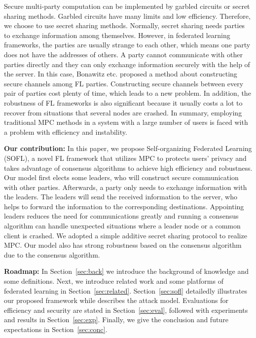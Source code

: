 Secure multi-party computation can be implemented by garbled circuits or secret sharing methods\cite{Shamir}. Garbled circuits have many limits and low efficiency. Therefore, we choose to use secret sharing methods. Normally, secret sharing needs parties to exchange information among themselves. However, in federated learning frameworks, the parties are usually strange to each other, which means one party does not have the addresses of others. A party cannot communicate with other parties directly and they can only exchange information securely with the help of the server. In this case, Bonawitz etc.\cite{Practical} proposed a method about constructing secure channels among FL parties. Constructing secure channels between every pair of parties cost plenty of time, which leads to a new problem. In addition, the robustness of FL frameworks is also significant because it usually costs a lot to recover from situations that several nodes are crashed. In summary, employing traditional MPC methods in a system with a large number of users is faced with a problem with efficiency and instability.

\textbf{Our contribution: }In this paper, we propose Self-organizing Federated Learning (SOFL), a novel FL framework that utilizes MPC to protects users' privacy and takes advantage of consensus algorithms to achieve high efficiency and robustness. Our model first elects some leaders, who will construct secure communication with other parties. Afterwards, a party only needs to exchange information with the leaders. The leaders will send the received information to the server, who helps to forward the information to the corresponding destinations. Appointing leaders reduces the need for communications greatly and running a consensus algorithm can handle unexpected situations where a leader node or a common client is crashed. We adopted a simple additive secret sharing protocol to realize MPC. Our model also has strong robustness based on the consensus algorithm due to the consensus algorithm. 

\textbf{Roadmap:} In Section~\ref{sec:back} we introduce the background of knowledge and some definitions. Next, we introduce related work and some platforms of federated learning in Section~\ref{sec:related}. Section~\ref{sec:sofl} detailedly illustrates our proposed framework while describes the attack model. Evaluations for efficiency and security are stated in Section~\ref{sec:eval}, followed with experiments and results in Section~\ref{sec:exp}. Finally, we give the conclusion and future expectations in Section~\ref{sec:conc}.